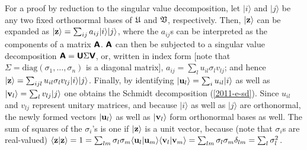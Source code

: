{\color{OliveGreen}
\bproof
For a proof by reduction to the singular value decomposition,
let
$\vert i\rangle$
and
$\vert j\rangle$
be any two fixed orthonormal bases of $ {\frak U}$ and $ {\frak V}$, respectively.
Then,
$\vert {\bf z}\rangle $
can be expanded as
$\vert {\bf z}\rangle  = \sum_{ij}a_{ij} \vert i\rangle \vert j\rangle$,
where the $a_{ij}$s can be interpreted as the components of a matrix
$\textsf{\textbf{A}}$.
$\textsf{\textbf{A}}$ can then be subjected to a
singular value decomposition
$\textsf{\textbf{A}} = \textsf{\textbf{U}} \Sigma \textsf{\textbf{V}}$,
or, written in index form [note that $\Sigma=\textrm{diag}(\sigma_1, \ldots, \sigma_n)$ is a diagonal matrix],
$a_{ij}= \sum_l u_{il}\sigma_l v_{lj}$;
and hence  $\vert {\bf z}\rangle  = \sum_{ijl} u_{il}\sigma_l v_{lj}\vert i\rangle \vert j\rangle$.
Finally, by identifying
$\vert {\bf u}_l  \rangle = \sum_i u_{il} \vert i\rangle$
as well as
$\vert {\bf v}_l  \rangle = \sum_l v_{lj} \vert j\rangle$
one obtains the Schmidt decomposition (\ref{2011-e-sd}).
Since $u_{il}$ and $v_{ lj}$ represent unitary matrices,
and because
 $\vert i\rangle$ as well as
 $\vert j\rangle$
are orthonormal,
the newly formed vectors
$\vert {\bf u}_l \rangle$
as well as
$\vert {\bf v}_l  \rangle$
form orthonormal bases as well.
The sum of squares of the $\sigma_i$'s is one if  $\vert {\bf z}\rangle $ is a unit vector,
because  (note that $\sigma_i$s are real-valued)
 $\langle {\bf z}\vert {\bf z}\rangle =1
=   \sum_{lm} \sigma_l \sigma_m   \langle {\bf u}_l  \vert  {\bf u}_m  \rangle   \langle  {\bf v}_l  \vert  {\bf v}_m  \rangle
=   \sum_{lm} \sigma_l \sigma_m  \delta_{lm}
=   \sum_{l} \sigma_l^2
$.
\eproof
}

